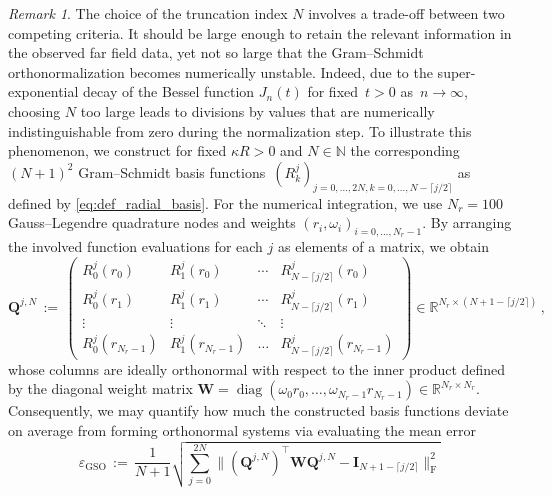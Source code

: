 \documentclass[11pt,a4paper]{article}
\theoremstyle{definition}
\theoremstyle{remark} \newtheorem{remark}[theorem]{Remark}
\numberwithin{equation}{section}
\numberwithin{figure}{section}
\numberwithin{algorithm}{section}
\numberwithin{table}{section}
\newcommand{\field}[1]{{\mathbb{#1}}}
\newcommand{\N}{\field{N}}
\newcommand{\R}{\field{R}}
\newcommand{\bs}{\boldsymbol}
\newcommand{\bfI}{{\bs I}}
\newcommand{\bfQ}{{\bs Q}}
\newcommand{\bfW}{{\bs W}}
\DeclareMathOperator{\diag}{diag}
\begin{document}
\begin{remark}
\label{rem:Choice_N}
    The choice of the truncation index $N$ involves a trade-off between two competing criteria.
    It should be large enough to retain the relevant information in the observed far field data, yet not so large that the Gram--Schmidt orthonormalization becomes numerically unstable.
    Indeed, due to the super-exponential decay of the Bessel function $J_n(t)$ for fixed~$t>0$ as~${n\rightarrow\infty}$, choosing $N$ too large leads to divisions by values that are numerically indistinguishable from zero during the normalization step.
    To illustrate this phenomenon, we construct for fixed $\kappa R>0$ and $N\in\N$ the corresponding $(N+1)^2$ Gram--Schmidt basis functions~${(R_k^{j})_{j=0,\ldots,2N, k=0,\ldots,N-\lceil j/2\rceil}}$ as defined by \eqref{eq:def_radial_basis}.
    For the numerical integration, we use $N_r=100$ Gauss–Legendre quadrature nodes and weights $(r_i,\omega_i)_{i=0,\ldots,N_r-1}$.
    By arranging the involved function evaluations for each $j$ as elements of a matrix, we obtain
    \begin{equation*}
        \bfQ^{j,N}
        \,:=\, 
        \begin{pmatrix}
            R_0^{j}(r_0) & R_1^{j}(r_0) & \cdots & R_{N-\lceil j/2\rceil}^{j}(r_0) \\
            R_0^{j}(r_1) & R_1^{j}(r_1) & \cdots & R_{N-\lceil j/2\rceil}^{j}(r_1) \\
            \vdots & \vdots & \ddots & \vdots \\
            R_0^{j}(r_{N_r-1}) & R_1^{j}(r_{N_r-1}) & \ldots & R_{N-\lceil j/2\rceil}^{j}(r_{N_r-1})
        \end{pmatrix}
        \in \R^{N_r\times (N+1-\lceil j/2\rceil)}\,,
    \end{equation*}
    whose columns are ideally orthonormal with respect to the inner product defined by the diagonal weight matrix $\bfW=\diag(\omega_{0}r_0,\ldots,\omega_{N_r-1}r_{N_r-1})\in\R^{N_r\times N_r}$.
    Consequently, we may quantify how much the constructed basis functions deviate on average from forming orthonormal systems via evaluating the mean error
    \begin{equation}
    \label{eq:GSO_error}
        \varepsilon_{\text{GSO}} \,:=\, \frac 1 {N+1} \sqrt{\sum_{j=0}^{2N}\big\|(\bfQ^{j,N})^\top \bfW\bfQ^{j,N} -\bfI_{N+1-\lceil j/2\rceil} \big\|^2_{\mathrm F}}
    \end{equation}

\end{remark}
\end{document}
